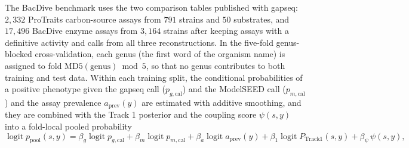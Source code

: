 \documentclass[10pt]{article}
\begin{document}
The BacDive benchmark uses the two comparison tables published with gapseq: $2{,}332$ ProTraits carbon-source assays from $791$ strains and $50$ substrates, and $17{,}496$ BacDive enzyme assays from $3{,}164$ strains after keeping assays with a definitive activity and calls from all three reconstructions. In the five-fold genus-blocked cross-validation, each genus (the first word of the organism name) is assigned to fold $\text{MD5}(\text{genus}) \bmod 5$, so that no genus contributes to both training and test data. Within each training split, the conditional probabilities of a positive phenotype given the gapseq call ($p_{g,\text{cal}}$) and the ModelSEED call ($p_{m,\text{cal}}$) and the assay prevalence $a_{\text{prev}}(y)$ are estimated with additive smoothing, and they are combined with the Track 1 posterior and the coupling score $\psi(s, y)$ into a fold-local pooled probability
\begin{equation}
  \operatorname{logit} p_{\text{pool}}(s, y) = \beta_g \operatorname{logit} p_{g,\text{cal}} + \beta_m \operatorname{logit} p_{m,\text{cal}} + \beta_a \operatorname{logit} a_{\text{prev}}(y) + \beta_1 \operatorname{logit} P_{\text{Track1}}(s, y) + \beta_\psi\,\psi(s, y),
\end{equation}
\end{document}
